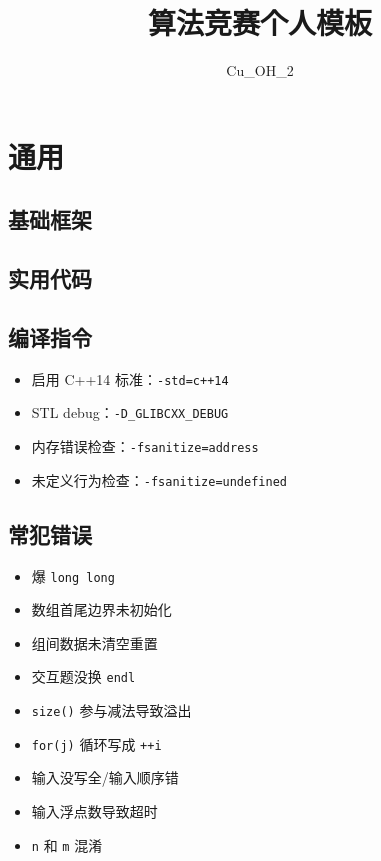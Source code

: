 \documentclass[twocolumn,a4,8pt]{article}  %
\title{\CJKfamily{hei} \bfseries 算法竞赛个人模板}
\author{Cu\_OH\_2}
\begin{document}
	\begin{titlepage}
		\maketitle
	\end{titlepage}
	
	\newpage
	\pagestyle{empty}
	\renewcommand{\contentsname}{目录}
	\tableofcontents
	
	\newpage
	\clearpage
	\newpage
	\pagestyle{fancy}
	\setcounter{page}{1} %
	
	\footnotesize
	
	\section{通用}
		\subsection{基础框架}
			
			
		\subsection{实用代码}
			
		
		\subsection{编译指令}
	 		\noindent\begin{itemize}
\item 启用 C++14 标准：\texttt{-std=c++14}
\item STL debug：\texttt{-D\_GLIBCXX\_DEBUG}
\item 内存错误检查：\texttt{-fsanitize=address}
\item 未定义行为检查：\texttt{-fsanitize=undefined}
	 		\end{itemize}
			
		\subsection{常犯错误}
	 		\noindent\begin{itemize}
\item 爆 \texttt{long long}
\item 数组首尾边界未初始化
\item 组间数据未清空重置
\item 交互题没换 \texttt{endl}
\item \texttt{size()} 参与减法导致溢出
\item \texttt{for(j)} 循环写成 \texttt{++i}
\item 输入没写全/输入顺序错
\item 输入浮点数导致超时
\item \texttt{n} 和 \texttt{m} 混淆
	 		\end{itemize}
			
\end{document}
